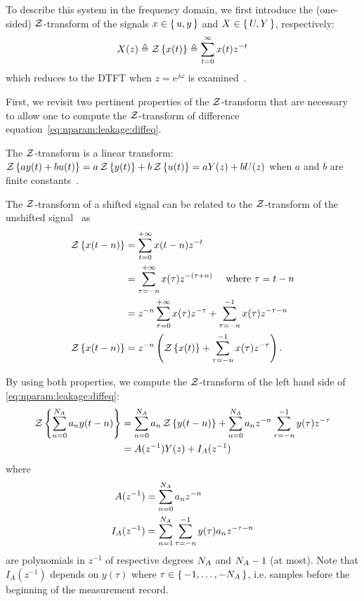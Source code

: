 \documentclass{responseletter}
\begin{document}
\begin{enumerate}
\begin{newquote}
To describe this system in the frequency domain, we first introduce the (one-sided) $\operatorname{\mathcal{Z}}$-transform of the signals $x \in \set{u,y}$ and $X \in \set{U,Y}$, respectively:
\begin{equation}
  X(z) 
  \triangleq 
  \operatorname{\mathcal{Z}} \left\{ x(t) \right\} 
  \triangleq \sum_{t=0}^{\infty} x(t) z^{-t}
\end{equation}
which reduces to the \gls{DTFT} when $z = e^{j\omega}$ is examined~\citep[Chapter 10]{Oppenheim1996}.

First, we revisit two pertinent properties of the $\operatorname{\mathcal{Z}}$-transform that are necessary to allow one to compute the $\operatorname{\mathcal{Z}}$-transform of difference equation~\eqref{eq:nparam:leakage:diffeq}.
\begin{property}[1]
The $\operatorname{\mathcal{Z}}$-transform is a linear transform: $\operatorname{\mathcal{Z}} \left\{ ay(t) + bu(t) \right\} = a \operatorname{\mathcal{Z}} \left\{ y(t) \right\} + b \operatorname{\mathcal{Z}} \left\{ u(t) \right\}= aY(z) + bU(z)$ when $a$ and $b$ are finite constants~\citep[Section 10.5.1]{Oppenheim1996}.
\end{property}
\begin{property}[2]
The $\operatorname{\mathcal{Z}}$-transform of a shifted signal can be related to the $\operatorname{\mathcal{Z}}$-transform of the unshifted signal~\citep[Section 10.5.2]{Oppenheim1996} as
\begin{align}
  \operatorname{\mathcal{Z}} \left\{ x(t-n) \right\} 
  &= \sum_{t=0}^{+\infty} x(t-n) z^{-t} \\
  &= \sum_{\tau = -n}^{+\infty} x(\tau) z^{-(\tau + n)} \quad \text{ where } \tau = t - n\\
  &= z^{-n} \sum_{\tau = 0}^{+\infty} x(\tau) z^{-\tau} +  \sum_{\tau = -n}^{-1} x(\tau) z^{-\tau-n}\\
  \operatorname{\mathcal{Z}} \left\{ x(t-n) \right\} &= z^{-n} \left( \operatorname{\mathcal{Z}} \left\{ x(t) \right\} + \sum_{\tau = -n}^{-1} x(\tau) z^{-\tau} \right)
  \text{.}
\end{align}
\end{property}

By using both properties, we compute the $\operatorname{\mathcal{Z}}$-transform of the left hand side of \eqref{eq:nparam:leakage:diffeq}:
\begin{align}
  \operatorname{\mathcal{Z}} \left\{ \sum_{n=0}^{N_{A}} a_n y(t-n) \right\}
  &=
  \sum_{n=0}^{N_{A}} a_n \operatorname{\mathcal{Z}} \left\{ y(t-n) \right\}
  +\sum_{n=0}^{N_{A}} a_n z^{-n}  \sum_{\tau = -n}^{-1} y(\tau) z^{-\tau}  \\
  &=
  A(z^{-1}) Y(z) + I_A(z^{-1})
\end{align}
where
\begin{align}
  A(z^{-1}) &= \sum_{n=0}^{N_{A}} a_n z^{-n} \\
  I_A(z^{-1}) &= \sum_{n=1}^{N_{A}} \sum_{\tau = -n}^{-1} y(\tau) a_n z^{-\tau-n}
\end{align}
are polynomials in $z^{-1}$ of respective degrees $N_{A}$ and  $N_{A}-1$ (at most).
Note that $I_A(z^{-1})$ depends on $y(\tau)$ where $\tau \in \set{-1, \ldots, -\ensuremath{N_{A}}}$, i.e. samples before the beginning of the measurement record.


\end{newquote}
\end{enumerate}
\end{document}
